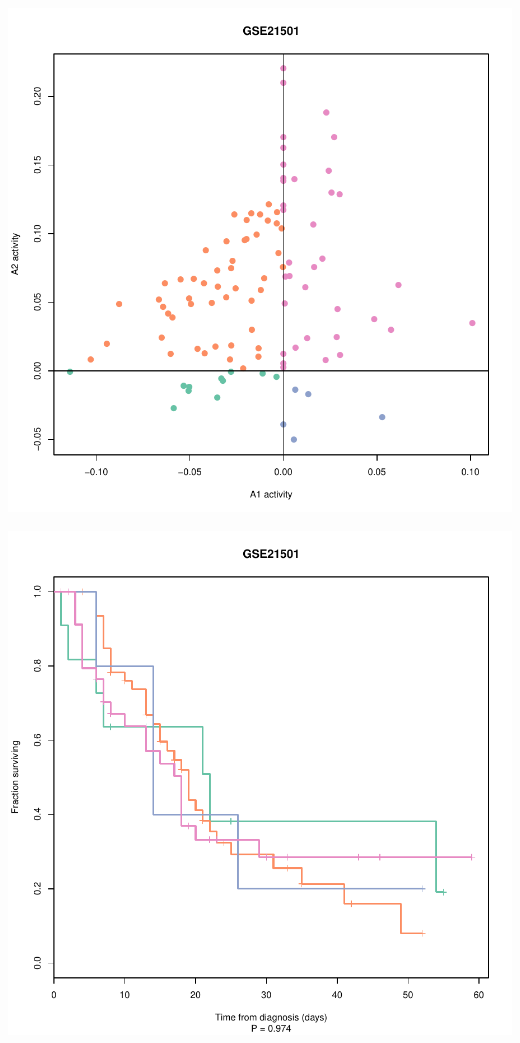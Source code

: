\documentclass{article}\usepackage[]{graphicx}\usepackage[]{color}
\makeatletter
\def\maxwidth{ %
  \ifdim\Gin@nat@width>\linewidth
    \linewidth
  \else
    \Gin@nat@width
  \fi
}
\newenvironment{knitrout}{}{} %
\makeatother
\begin{document}
\begin{knitrout}
{\centering \includegraphics[width=\maxwidth]{figure/km-curves-3} 

}




{\centering \includegraphics[width=\maxwidth]{figure/km-curves-4} 

}
\end{knitrout}
\end{document}
